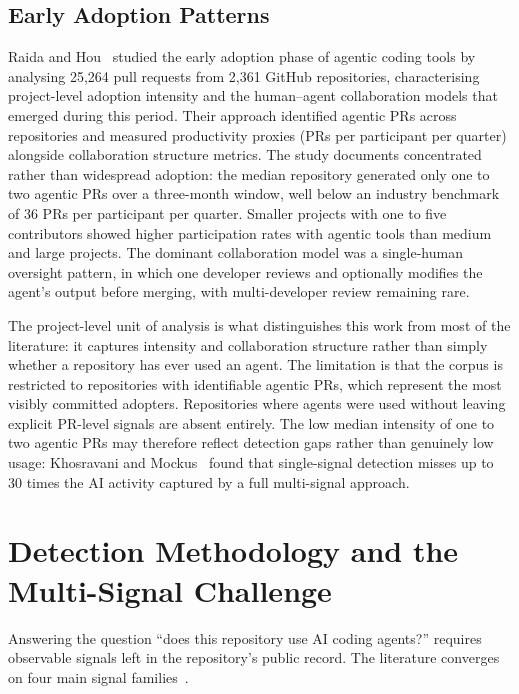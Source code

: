 \subsection{Early Adoption Patterns}

Raida and Hou~\cite{raida2026} studied the early adoption phase of agentic coding
tools by analysing 25,264 pull requests from 2,361 GitHub repositories, characterising
project-level adoption intensity and the human--agent collaboration models that emerged
during this period. Their approach identified agentic PRs across repositories and
measured productivity proxies (PRs per participant per quarter) alongside
collaboration structure metrics. The study documents concentrated rather than
widespread adoption: the median repository generated only one to two agentic PRs
over a three-month window, well below an industry benchmark of 36 PRs per participant
per quarter. Smaller projects with one to five contributors showed higher participation
rates with agentic tools than medium and large projects. The dominant collaboration
model was a single-human oversight pattern, in which one developer reviews and
optionally modifies the agent's output before merging, with multi-developer review
remaining rare.

The project-level unit of analysis is what distinguishes this work from most of the
literature: it captures intensity and collaboration structure rather than simply
whether a repository has ever used an agent. The limitation is that the corpus is
restricted to repositories with identifiable agentic PRs, which represent the most
visibly committed adopters. Repositories where agents were used without leaving
explicit PR-level signals are absent entirely. The low median intensity of one to two
agentic PRs may therefore reflect detection gaps rather than genuinely low usage:
Khosravani and Mockus~\cite{khosravani2026} found that single-signal detection misses
up to 30 times the AI activity captured by a full multi-signal approach.

\section{Detection Methodology and the Multi-Signal Challenge}
\label{sec:lr:detection}

Answering the question ``does this repository use AI coding agents?'' requires
observable signals left in the repository's public record. The literature
converges on four main signal families~\cite{robbesHeuristics2026,
galsterConfig2026, khosravani2026}.

